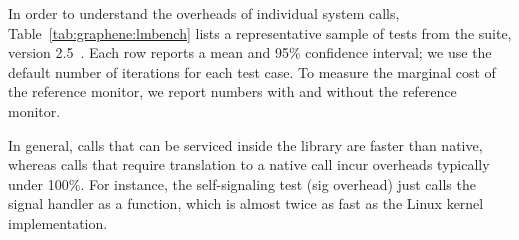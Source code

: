 In order to understand the overheads of individual system calls,
Table~\ref{tab:graphene:lmbench} lists 
a representative sample of 
tests from the
\lmbench{} suite, version 2.5~\cite{McVoy:lmbench}.
Each row reports a mean and 95\% confidence interval;
we use the default number of iterations for each test case.
To measure the marginal cost of the reference monitor, we report numbers with and without 
the reference monitor.

In general, calls that can be serviced inside the library are faster than native,
whereas calls that require translation to a native call incur overheads typically under 100\%.
For instance, 
the self-signaling test (sig overhead)
just calls the signal handler as a function,
which is almost twice as fast
as the Linux kernel implementation.  

